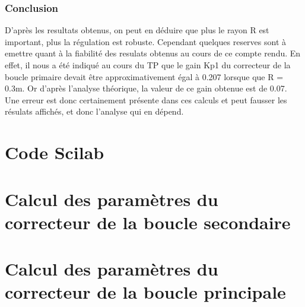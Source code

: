 \documentclass[a4paper,12pt]{article}
\begin{document}
				\subsubsection{Conclusion}
					\par D'après les resultats obtenus, on peut en déduire que plus le rayon R est important, plus la régulation est robuste.
					Cependant quelques reserves sont à emettre quant à la fiabilité des resulats obtenus au cours de ce compte rendu.
					En effet, il nous a été indiqué au cours du TP que le gain Kp1 du correcteur de la boucle primaire devait être approximativement égal à 0.207 lorsque que R = 0.3m.
					Or d'après l'analyse théorique, la valeur de ce gain obtenue est de 0.07.
					Une erreur est donc certainement présente dans ces calculs et peut fausser les résulats affichés, et donc l'analyse qui en dépend.


	\appendix
		\section{Code Scilab}
		\begin{center}
			
			
			
		\end{center}
		
		\section{Calcul des paramètres du correcteur de la boucle secondaire}
		\label{sec:CalcParamCorH2}
		\newpage

		\section{Calcul des paramètres du correcteur de la boucle principale}
		\label{sec:CalcParamCorH1}
		\newpage
\end{document}
